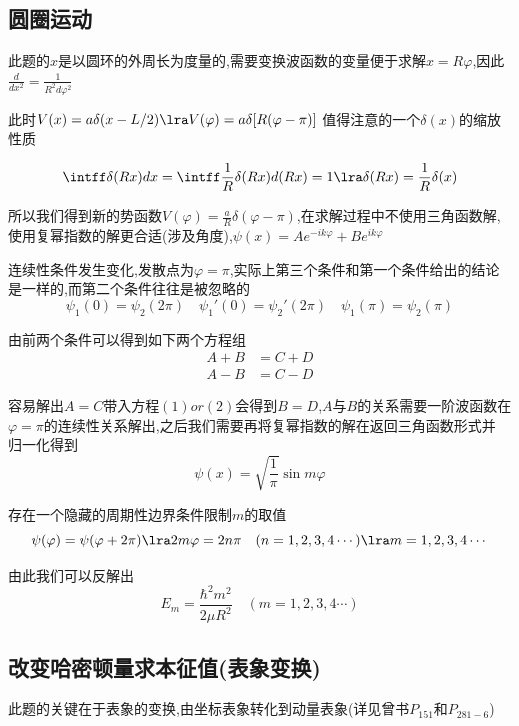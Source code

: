        \subsection{圆圈运动}

        此题的$x$是以圆环的外周长为度量的,需要变换波函数的变量便于求解$x=R\varphi$,因此$\frac{d}{dx^{2}}=\frac{1}{R^{2}d\varphi^{2}}$

        此时$V(x)=a\delta(x-L/2) \lra V(\varphi) = a \delta[R(\varphi-\pi)]$
        值得注意的一个$\delta(x)$的缩放性质
        \begin{formal}
            $$ \intff \delta(Rx)dx = \intff \frac{1}{R} \delta(Rx) d(Rx) = 1 \lra \delta(Rx) = \frac{1}{R}\delta(x)$$
        \end{formal}

        所以我们得到新的势函数$V(\varphi) = \frac{a}{R} \delta(\varphi-\pi) $,在求解过程中不使用三角函数解,使用复幂指数的解更合适(涉及角度),\quad $\psi(x) = Ae^{-ik\varphi} + Be^{ik\varphi}$

        连续性条件发生变化,发散点为$\varphi = \pi$,实际上第三个条件和第一个条件给出的结论是一样的,而第二个条件往往是被忽略的
        $$ \psi_{1}(0) = \psi_{2}(2\pi) \quad \psi_{1}'(0) = \psi_{2}'(2\pi)\quad \psi_{1}(\pi) = \psi_{2}(\pi) $$
        
        由前两个条件可以得到如下两个方程组
        \begin{align}
            A+B&=C+D\\
            A-B&=C-D
        \end{align}

        容易解出$A=C$带入方程$(1)or(2)$会得到$B=D$,$A$与$B$的关系需要一阶波函数在$\varphi=\pi$的连续性关系解出,之后我们需要再将复幂指数的解在返回三角函数形式并
        归一化得到
        $$ \psi(x) = \sqrt{\frac{1}{\pi}} \sin{m \varphi} $$
        
        存在一个隐藏的周期性边界条件限制$m$的取值
        $$ \psi(\varphi) = \psi(\varphi+2\pi) \lra 2m\varphi = 2n\pi \quad (n=1,2,3,4\cdots) \lra m = 1,2,3,4\cdots $$
        
        由此我们可以反解出
        $$ E_{m} = \frac{\hbar^{2} m^{2}}{2\mu R^{2}} \quad (m=1,2,3,4\cdots)$$

        \subsection{改变哈密顿量求本征值(表象变换)}
            此题的关键在于表象的变换,由坐标表象转化到动量表象(详见曾书$P_{151}$和$P_{281-6}$)
            
